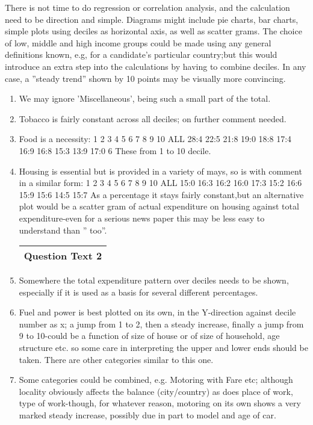 \documentclass[a4paper,12pt]{article}
\begin{document}
\begin{enumerate}[(a)]
There is not time to do regression or correlation analysis, and the calculation need to be
direction and simple. Diagrams might include pie charts, bar charts, simple plots using deciles
as horizontal axis, as well as scatter grams.
The choice of low, middle and high income groups could be made using any general definitions
known, e.g, for a candidate’s particular country;but this would introduce an extra step into the
calculations by having to combine deciles. In any case, a ”steady trend” shown by 10 points
may be visually more convincing.
\begin{enumerate}
\item  We may ignore ’Miscellaneous’, being such a small part of the total.
\item  Tobacco is fairly constant across all deciles; on further comment needed.
\item  Food is a necessity: %
1 2 3 4 5 6 7 8 9 10 ALL
28:4 22:5 21:8 19:0 18:8 17:4 16:9 16:8 15:3 13:9 17:0
6
These %
from 1 to 10 decile.
\item  Housing is essential but is provided in a variety of mays, so is with comment in a similar
form: %
1 2 3 4 5 6 7 8 9 10 ALL
15:0 16:3 16:2 16:0 17:3 15:2 16:6 15:9 15:6 14:5 15:7
As a percentage it stays fairly constant,but an alternative plot would be a scatter gram
of actual expenditure on housing against total expenditure-even for a serious news paper
this may be less easy to understand than ”%
too”.
  \begin{table}[ht!]
     \centering
     \begin{tabular}{|p{15cm}|}
     \hline  
Question Text 2   
 \\ \hline 
      \end{tabular}
    \end{table}\item  Somewhere the total expenditure pattern over deciles needs to be shown, especially if it
is used as a basis for several different percentages.
\item  Fuel and power is best plotted on its own, in the Y-direction against decile number as x; a
jump from 1 to 2, then a steady increase, finally a jump from 9 to 10-could be a function
of size of house or of size of household, age structure etc. so some care in interpreting
the upper and lower ends should be taken. There are other categories similar to this one.
\item  Some categories could be combined, e.g. Motoring with Fare etc; although locality
obviously affects the balance (city/country) as does place of work, type of work-though,
for whatever reason, motoring on its own shows a very marked steady increase, possibly
due in part to model and age of car.


\end{enumerate}
\end{enumerate}
\end{document}
